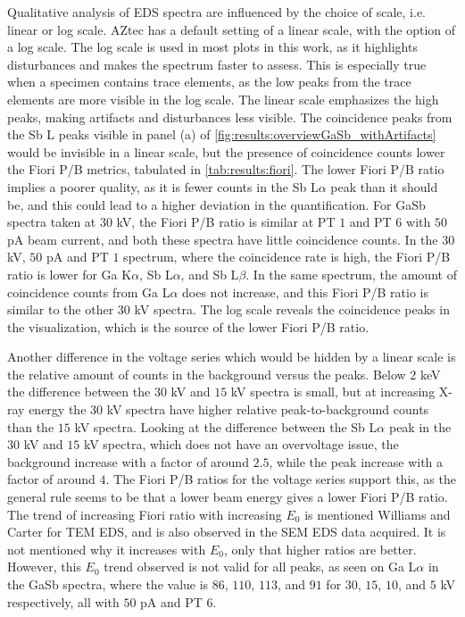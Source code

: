 Qualitative analysis of EDS spectra are influenced by the choice of scale, i.e. linear or log scale.
AZtec has a default setting of a linear scale, with the option of a log scale.
The log scale is used in most plots in this work, as it highlights disturbances and makes the spectrum faster to assess.
This is especially true when a specimen contains trace elements, as the low peaks from the trace elements are more visible in the log scale.
The linear scale emphasizes the high peaks, making artifacts and disturbances less visible.
The coincidence peaks from the Sb L peaks visible in panel (a) of \cref{fig:results:overviewGaSb_withArtifacts} would be invisible in a linear scale, but the presence of coincidence counts lower the Fiori P/B metrics, tabulated in \cref{tab:results:fiori}.
The lower Fiori P/B ratio implies a poorer quality, as it is fewer counts in the Sb L$\alpha$ peak than it should be, and this could lead to a higher deviation in the quantification.
For GaSb spectra taken at $30$ kV, the Fiori P/B ratio is similar at PT $1$ and PT $6$ with $50$ pA beam current, and both these spectra have little coincidence counts.
In the $30$ kV, $50$ pA and PT $1$ spectrum, where the coincidence rate is high, the Fiori P/B ratio is lower for Ga K$\alpha$, Sb L$\alpha$, and Sb L$\beta$.
In the same spectrum, the amount of coincidence counts from Ga L$\alpha$ does not increase, and this Fiori P/B ratio is similar to the other $30$ kV spectra.
The log scale reveals the coincidence peaks in the visualization, which is the source of the lower Fiori P/B ratio.


Another difference in the voltage series which would be hidden by a linear scale is the relative amount of counts in the background versus the peaks.
Below $2$ keV the difference between the $30$ kV and $15$ kV spectra is small, but at increasing X-ray energy the $30$ kV spectra have higher relative peak-to-background counts than the $15$ kV spectra.
Looking at the difference between the Sb L$\alpha$ peak in the $30$ kV and $15$ kV spectra, which does not have an overvoltage issue, the background increase with a factor of around $2.5$, while the peak increase with a factor of around $4$.
The Fiori P/B ratios for the voltage series support this, as the general rule seems to be that a lower beam energy gives a lower Fiori P/B ratio.
The trend of increasing Fiori ratio with increasing $E_0$ is mentioned Williams and Carter \cite[p. 614]{williams_carter_tem_2009} for TEM EDS, and is also observed in the SEM EDS data acquired.
It is not mentioned why it increases with $E_0$, only that higher ratios are better.
However, this $E_0$ trend observed is not valid for all peaks, as seen on Ga L$\alpha$ in the GaSb spectra, where the value is $86$, $110$, $113$, and $91$ for $30$, $15$, $10$, and $5$ kV respectively, all with $50$ pA and PT $6$.


